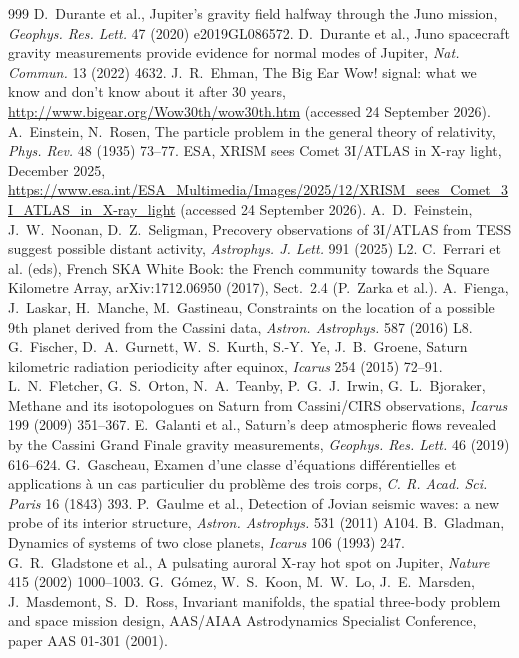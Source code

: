 \documentclass[11pt]{article}
\theoremstyle{definition}\newtheorem{definition}[theorem]{Definition}
\theoremstyle{remark}\newtheorem{remark}[theorem]{Remark}
\begin{document}
\begin{thebibliography}{999}
 D.~Durante et al., Jupiter's gravity field halfway through the Juno mission, \emph{Geophys. Res. Lett.} 47 (2020) e2019GL086572.
 D.~Durante et al., Juno spacecraft gravity measurements provide evidence for normal modes of Jupiter, \emph{Nat. Commun.} 13 (2022) 4632.
 J.~R.~Ehman, The Big Ear Wow! signal: what we know and don't know about it after 30 years, \url{http://www.bigear.org/Wow30th/wow30th.htm} (accessed 24 September 2026).
 A.~Einstein, N.~Rosen, The particle problem in the general theory of relativity, \emph{Phys. Rev.} 48 (1935) 73--77.
 ESA, XRISM sees Comet 3I/ATLAS in X-ray light, December 2025, \url{https://www.esa.int/ESA_Multimedia/Images/2025/12/XRISM_sees_Comet_3I_ATLAS_in_X-ray_light} (accessed 24 September 2026).
 A.~D.~Feinstein, J.~W.~Noonan, D.~Z.~Seligman, Precovery observations of 3I/ATLAS from TESS suggest possible distant activity, \emph{Astrophys. J. Lett.} 991 (2025) L2.
 C.~Ferrari et al. (eds), French SKA White Book: the French community towards the Square Kilometre Array, arXiv:1712.06950 (2017), Sect.~2.4 (P.~Zarka et al.).
 A.~Fienga, J.~Laskar, H.~Manche, M.~Gastineau, Constraints on the location of a possible 9th planet derived from the Cassini data, \emph{Astron. Astrophys.} 587 (2016) L8.
 G.~Fischer, D.~A.~Gurnett, W.~S.~Kurth, S.-Y.~Ye, J.~B.~Groene, Saturn kilometric radiation periodicity after equinox, \emph{Icarus} 254 (2015) 72--91.
 L.~N.~Fletcher, G.~S.~Orton, N.~A.~Teanby, P.~G.~J.~Irwin, G.~L.~Bjoraker, Methane and its isotopologues on Saturn from Cassini/CIRS observations, \emph{Icarus} 199 (2009) 351--367.
 E.~Galanti et al., Saturn's deep atmospheric flows revealed by the Cassini Grand Finale gravity measurements, \emph{Geophys. Res. Lett.} 46 (2019) 616--624.
 G.~Gascheau, Examen d'une classe d'\'equations diff\'erentielles et applications \`a un cas particulier du probl\`eme des trois corps, \emph{C. R. Acad. Sci. Paris} 16 (1843) 393.
 P.~Gaulme et al., Detection of Jovian seismic waves: a new probe of its interior structure, \emph{Astron. Astrophys.} 531 (2011) A104.
 B.~Gladman, Dynamics of systems of two close planets, \emph{Icarus} 106 (1993) 247.
 G.~R.~Gladstone et al., A pulsating auroral X-ray hot spot on Jupiter, \emph{Nature} 415 (2002) 1000--1003.
 G.~G\'omez, W.~S.~Koon, M.~W.~Lo, J.~E.~Marsden, J.~Masdemont, S.~D.~Ross, Invariant manifolds, the spatial three-body problem and space mission design, AAS/AIAA Astrodynamics Specialist Conference, paper AAS 01-301 (2001).

\end{thebibliography}
\end{document}
